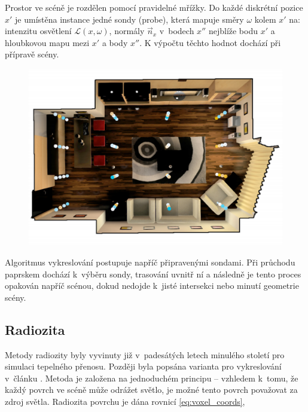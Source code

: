 Prostor ve scéně je rozdělen pomocí pravidelné mřížky. Do každé diskrétní pozice $x'$ je umístěna instance jedné sondy (probe), která mapuje směry $\omega$ kolem $x'$ na: intenzitu osvětlení $\mathcal{L}(x, \omega)$, normály $\vec{n}_x$ v~bodech $x''$ nejblíže bodu $x'$ a hloubkovou mapu mezi $x'$ a body $x''$. K výpočtu těchto hodnot dochází při přípravě scény.

\begin{figure}[H]
	\centering
	\captionsetup{justification=centering}
	\includegraphics[scale=0.25]{obrazky-figures/light_field_probes.png}
	\label{fig:probes_in_scene}
\end{figure}

Algoritmus vykreslování postupuje napříč připravenými sondami. Při průchodu paprskem dochází k~výběru sondy, trasování uvnitř ní a následně je tento proces opakován napříč scénou, dokud nedojde k~jisté intersekci nebo minutí geometrie scény.

\subsection{Radiozita}
Metody radiozity byly vyvinuty již v~padesátých letech minulého století pro simulaci tepelného přenosu. Později byla popsána varianta pro vykreslování v~článku \cite{radiosity}. Metoda je založena na jednoduchém principu -- vzhledem k~tomu, že každý povrch ve scéně může odrážet světlo, je možné tento povrch považovat za zdroj světla. Radiozita povrchu je dána rovnicí \ref{eq:voxel_coords},


